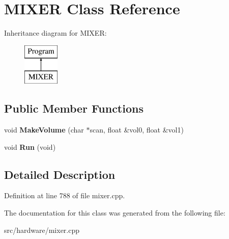 \hypertarget{classMIXER}{\section{M\-I\-X\-E\-R Class Reference}
\label{classMIXER}
}
Inheritance diagram for M\-I\-X\-E\-R\-:\begin{figure}[H]
\begin{center}
\leavevmode
\includegraphics[height=2.000000cm]{classMIXER}
\end{center}
\end{figure}
\subsection*{Public Member Functions}
\begin{DoxyCompactItemize}
\item 
\hypertarget{classMIXER_a85b8e090dc7b9a2c6d3fdf0935e7f824}{void {\bfseries Make\-Volume} (char $\ast$scan, float \&vol0, float \&vol1)}\label{classMIXER_a85b8e090dc7b9a2c6d3fdf0935e7f824}

\item 
\hypertarget{classMIXER_a5043b553511d83536361a96111c17a31}{void {\bfseries Run} (void)}\label{classMIXER_a5043b553511d83536361a96111c17a31}

\end{DoxyCompactItemize}


\subsection{Detailed Description}


Definition at line 788 of file mixer.\-cpp.



The documentation for this class was generated from the following file\-:\begin{DoxyCompactItemize}
\item 
src/hardware/mixer.\-cpp\end{DoxyCompactItemize}
